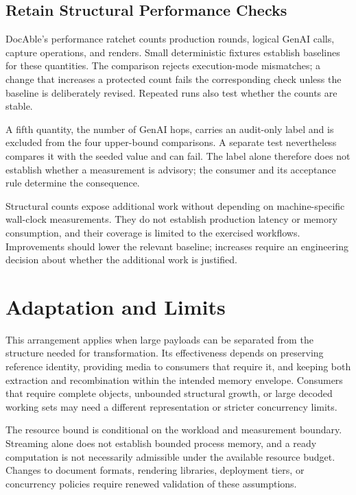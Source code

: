 \subsection*{Retain Structural Performance Checks}

DocAble's performance ratchet counts production rounds, logical GenAI calls, capture operations, and renders. Small deterministic fixtures establish baselines for these quantities. The comparison rejects execution-mode mismatches; a change that increases a protected count fails the corresponding check unless the baseline is deliberately revised. Repeated runs also test whether the counts are stable.

A fifth quantity, the number of GenAI hops, carries an audit-only label and is excluded from the four upper-bound comparisons. A separate test nevertheless compares it with the seeded value and can fail. The label alone therefore does not establish whether a measurement is advisory; the consumer and its acceptance rule determine the consequence.

Structural counts expose additional work without depending on machine-specific wall-clock measurements. They do not establish production latency or memory consumption, and their coverage is limited to the exercised workflows. Improvements should lower the relevant baseline; increases require an engineering decision about whether the additional work is justified.

\section{Adaptation and Limits}

This arrangement applies when large payloads can be separated from the structure needed for transformation. Its effectiveness depends on preserving reference identity, providing media to consumers that require it, and keeping both extraction and recombination within the intended memory envelope. Consumers that require complete objects, unbounded structural growth, or large decoded working sets may need a different representation or stricter concurrency limits.

The resource bound is conditional on the workload and measurement boundary. Streaming alone does not establish bounded process memory, and a ready computation is not necessarily admissible under the available resource budget. Changes to document formats, rendering libraries, deployment tiers, or concurrency policies require renewed validation of these assumptions.
